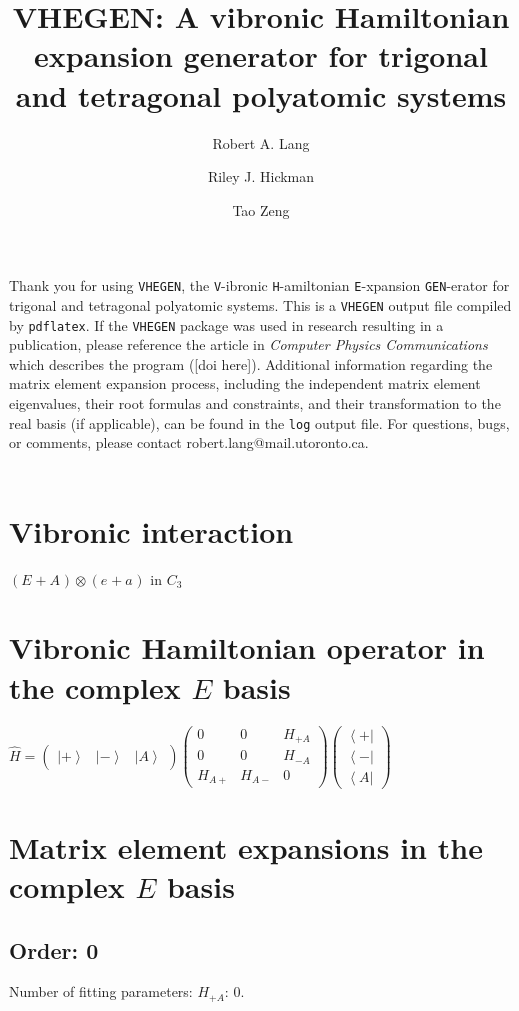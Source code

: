 \documentclass[fleqn]{article}
\title{VHEGEN: A vibronic Hamiltonian expansion generator for trigonal and tetragonal polyatomic systems}
\author{Robert A. Lang \and Riley J. Hickman \and Tao Zeng}
\date{}
\begin{document}
\maketitle
Thank you for using \texttt{VHEGEN}, the \texttt{V}-ibronic \texttt{H}-amiltonian \texttt{E}-xpansion \texttt{GEN}-erator for trigonal and tetragonal polyatomic systems. This is a \texttt{VHEGEN} output file compiled by \texttt{pdflatex}. If the \texttt{VHEGEN} package was used in research resulting in a publication, please reference the article in \textit{Computer Physics Communications} which describes the program ([doi here]). Additional information regarding the matrix element expansion process, including the independent matrix element eigenvalues, their root formulas and constraints, and their transformation to the real basis (if applicable), can be found in the \texttt{log} output file. For questions, bugs, or comments, please contact robert.lang@mail.utoronto.ca.\\\\
\tableofcontents
\newpage
\section{Vibronic interaction}
$(E_{}+A_{}) \otimes (e_{}+a_{})$ in $C_{3}$
\section{Vibronic Hamiltonian operator in the complex $E$ basis}
$\hat{H}=\left(\begin{matrix}{\left|+\right\rangle } & {\left|-\right\rangle } & {\left|A\right\rangle }\end{matrix}\right) \left(\begin{matrix}0 & 0 & H_{+A}\\0 & 0 & H_{-A}\\H_{A+} & H_{A-} & 0\end{matrix}\right) \left(\begin{matrix}{\left\langle +\right|}\\{\left\langle -\right|}\\{\left\langle A\right|}\end{matrix}\right)$
\section{Matrix element expansions in the complex $E$ basis}
\subsection{Order: 0}
Number of fitting parameters: $H_{+A}$: $0$.
\end{document}
